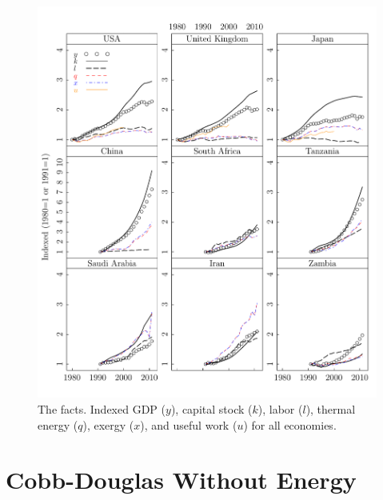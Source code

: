 \documentclass[preprint,authoryear,12pt]{elsarticle}\usepackage{graphicx, color}
\makeatletter
\def\maxwidth{ %
  \ifdim\Gin@nat@width>\linewidth
    \linewidth
  \else
    \Gin@nat@width
  \fi
}
\newenvironment{knitrout}{}{} %
\makeatother
\begin{document}
\begin{knitrout}
\color{fgcolor}\begin{figure}[]

\includegraphics[width=\maxwidth]{figure/Factors_Lattice_Graph} \caption[The facts]{The facts. Indexed GDP ($y$), capital stock ($k$), labor ($l$), thermal energy ($q$), exergy ($x$), and useful work ($u$) for all economies.\label{fig:Factors_Lattice_Graph}}
\end{figure}


\end{knitrout}


\section{Cobb-Douglas Without Energy}
\end{document}
